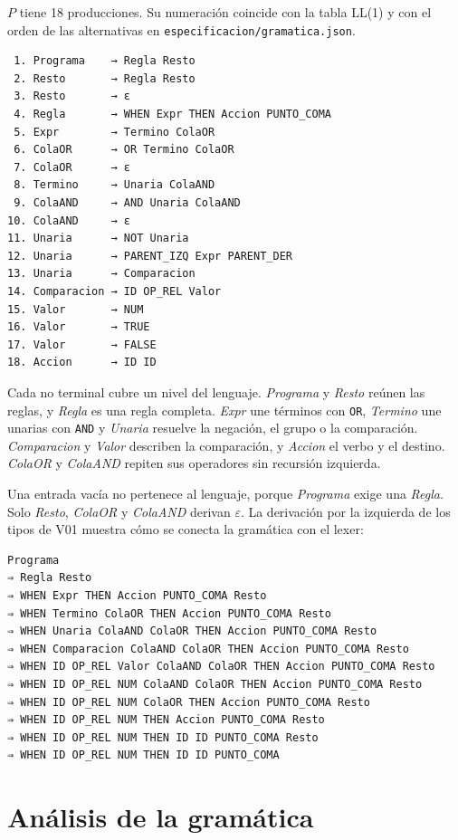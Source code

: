 \documentclass[11pt,a4paper]{article}
\newcommand{\tk}[1]{\texttt{#1}}
\newcommand{\nt}[1]{\textit{#1}}
\begin{document}
$P$ tiene 18 producciones. Su numeración coincide con la tabla
LL(1) y con el orden de las alternativas en
\texttt{especificacion/gramatica.json}.

\begin{Verbatim}
 1. Programa    → Regla Resto
 2. Resto       → Regla Resto
 3. Resto       → ε
 4. Regla       → WHEN Expr THEN Accion PUNTO_COMA
 5. Expr        → Termino ColaOR
 6. ColaOR      → OR Termino ColaOR
 7. ColaOR      → ε
 8. Termino     → Unaria ColaAND
 9. ColaAND     → AND Unaria ColaAND
10. ColaAND     → ε
11. Unaria      → NOT Unaria
12. Unaria      → PARENT_IZQ Expr PARENT_DER
13. Unaria      → Comparacion
14. Comparacion → ID OP_REL Valor
15. Valor       → NUM
16. Valor       → TRUE
17. Valor       → FALSE
18. Accion      → ID ID
\end{Verbatim}

Cada no terminal cubre un nivel del lenguaje. \nt{Programa} y
\nt{Resto} reúnen las reglas, y \nt{Regla} es una regla completa.
\nt{Expr} une términos con \tk{OR}, \nt{Termino} une unarias con
\tk{AND} y \nt{Unaria} resuelve la negación, el grupo o la
comparación. \nt{Comparacion} y \nt{Valor} describen la
comparación, y \nt{Accion} el verbo y el destino. \nt{ColaOR} y
\nt{ColaAND} repiten sus operadores sin recursión izquierda.

Una entrada vacía no pertenece al lenguaje, porque \nt{Programa}
exige una \nt{Regla}. Solo \nt{Resto}, \nt{ColaOR} y \nt{ColaAND}
derivan $\varepsilon$. La derivación por la izquierda de los tipos
de V01 muestra cómo se conecta la gramática con el lexer:

\begin{Verbatim}
Programa
⇒ Regla Resto
⇒ WHEN Expr THEN Accion PUNTO_COMA Resto
⇒ WHEN Termino ColaOR THEN Accion PUNTO_COMA Resto
⇒ WHEN Unaria ColaAND ColaOR THEN Accion PUNTO_COMA Resto
⇒ WHEN Comparacion ColaAND ColaOR THEN Accion PUNTO_COMA Resto
⇒ WHEN ID OP_REL Valor ColaAND ColaOR THEN Accion PUNTO_COMA Resto
⇒ WHEN ID OP_REL NUM ColaAND ColaOR THEN Accion PUNTO_COMA Resto
⇒ WHEN ID OP_REL NUM ColaOR THEN Accion PUNTO_COMA Resto
⇒ WHEN ID OP_REL NUM THEN Accion PUNTO_COMA Resto
⇒ WHEN ID OP_REL NUM THEN ID ID PUNTO_COMA Resto
⇒ WHEN ID OP_REL NUM THEN ID ID PUNTO_COMA
\end{Verbatim}

\section{Análisis de la gramática}
\label{sec:analisis}
\end{document}

